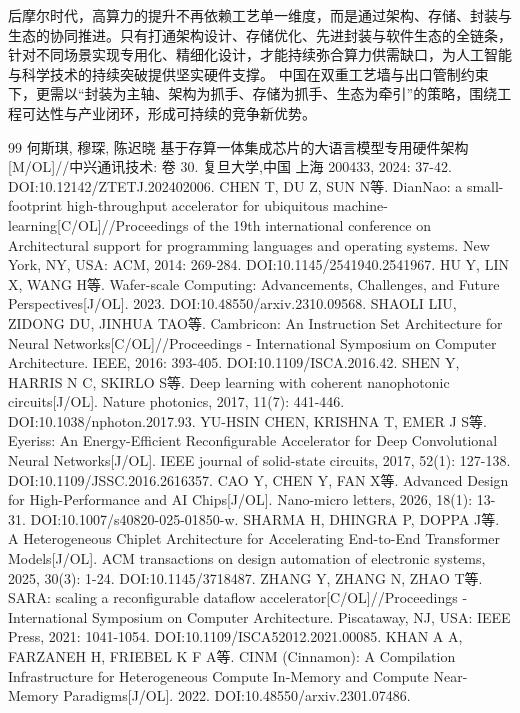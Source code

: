 \documentclass[12pt,a4paper]{article}%
\begin{document}
    后摩尔时代，高算力的提升不再依赖工艺单一维度，而是通过架构、存储、封装与生态的协同推进。只有打通架构设计、存储优化、先进封装与软件生态的全链条，针对不同场景实现专用化、精细化设计，才能持续弥合算力供需缺口，为人工智能与科学技术的持续突破提供坚实硬件支撑。
    中国在双重工艺墙与出口管制约束下，更需以“封装为主轴、架构为抓手、存储为抓手、生态为牵引”的策略，围绕工程可达性与产业闭环，形成可持续的竞争新优势。


\clearpage
	
	\begin{thebibliography}{99}  
		 何斯琪, 穆琛, 陈迟晓 基于存算一体集成芯片的大语言模型专用硬件架构[M/OL]//中兴通讯技术: 卷 30. 复旦大学,中国 上海 200433, 2024: 37-42. DOI:10.12142/ZTETJ.202402006.
         CHEN T, DU Z, SUN N等. DianNao: a small-footprint high-throughput accelerator for ubiquitous machine-learning[C/OL]//Proceedings of the 19th international conference on Architectural support for programming languages and operating systems. New York, NY, USA: ACM, 2014: 269-284. DOI:10.1145/2541940.2541967.
		 HU Y, LIN X, WANG H等. Wafer-scale Computing: Advancements, Challenges, and Future Perspectives[J/OL]. 2023. DOI:10.48550/arxiv.2310.09568.
		 SHAOLI LIU, ZIDONG DU, JINHUA TAO等. Cambricon: An Instruction Set Architecture for Neural Networks[C/OL]//Proceedings - International Symposium on Computer Architecture. IEEE, 2016: 393-405. DOI:10.1109/ISCA.2016.42.
		 SHEN Y, HARRIS N C, SKIRLO S等. Deep learning with coherent nanophotonic circuits[J/OL]. Nature photonics, 2017, 11(7): 441-446. DOI:10.1038/nphoton.2017.93.
		 YU-HSIN CHEN, KRISHNA T, EMER J S等. Eyeriss: An Energy-Efficient Reconfigurable Accelerator for Deep Convolutional Neural Networks[J/OL]. IEEE journal of solid-state circuits, 2017, 52(1): 127-138. DOI:10.1109/JSSC.2016.2616357.
		 CAO Y, CHEN Y, FAN X等. Advanced Design for High-Performance and AI Chips[J/OL]. Nano-micro letters, 2026, 18(1): 13-31. DOI:10.1007/s40820-025-01850-w.
         SHARMA H, DHINGRA P, DOPPA J等. A Heterogeneous Chiplet Architecture for Accelerating End-to-End Transformer Models[J/OL]. ACM transactions on design automation of electronic systems, 2025, 30(3): 1-24. DOI:10.1145/3718487.
         ZHANG Y, ZHANG N, ZHAO T等. SARA: scaling a reconfigurable dataflow accelerator[C/OL]//Proceedings - International Symposium on Computer Architecture. Piscataway, NJ, USA: IEEE Press, 2021: 1041-1054. DOI:10.1109/ISCA52012.2021.00085.
         KHAN A A, FARZANEH H, FRIEBEL K F A等. CINM (Cinnamon): A Compilation Infrastructure for Heterogeneous Compute In-Memory and Compute Near-Memory Paradigms[J/OL]. 2022. DOI:10.48550/arxiv.2301.07486.

\end{thebibliography}
\end{document}
